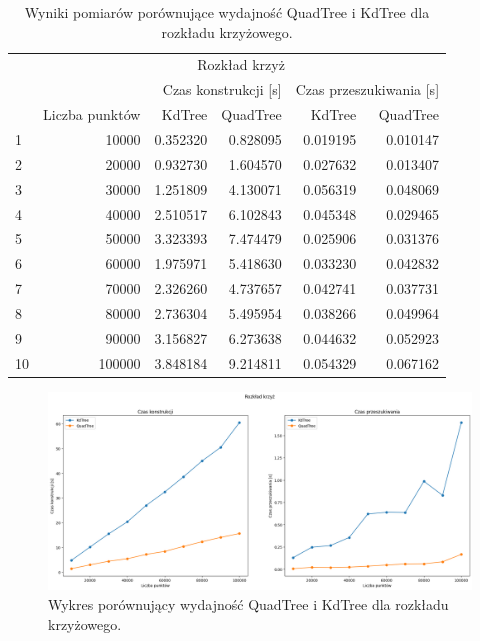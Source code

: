 \documentclass{lab}
\begin{document}
\begin{table}[H]
\centering
\begin{tabular}{lrrrrr}
  \toprule
   & \multicolumn{5}{c}{Rozkład krzyż} \\
   &  & \multicolumn{2}{r}{Czas konstrukcji [s]} & \multicolumn{2}{r}{Czas przeszukiwania [s]} \\
   & Liczba punktów & KdTree & QuadTree & KdTree & QuadTree \\
  \midrule
 1 & 10000 & 0.352320 & 0.828095 & 0.019195 & 0.010147 \\
2 & 20000 & 0.932730 & 1.604570 & 0.027632 & 0.013407 \\
3 & 30000 & 1.251809 & 4.130071 & 0.056319 & 0.048069 \\
4 & 40000 & 2.510517 & 6.102843 & 0.045348 & 0.029465 \\
5 & 50000 & 3.323393 & 7.474479 & 0.025906 & 0.031376 \\
6 & 60000 & 1.975971 & 5.418630 & 0.033230 & 0.042832 \\
7 & 70000 & 2.326260 & 4.737657 & 0.042741 & 0.037731 \\
8 & 80000 & 2.736304 & 5.495954 & 0.038266 & 0.049964 \\
9 & 90000 & 3.156827 & 6.273638 & 0.044632 & 0.052923 \\
10 & 100000 & 3.848184 & 9.214811 & 0.054329 & 0.067162 \\
  \bottomrule
  \end{tabular}
\caption{Wyniki pomiarów porównujące wydajność QuadTree i KdTree dla rozkładu krzyżowego.}
\label{tab:cross_time}
\end{table}

\begin{figure}[H]
  \centering
  \includegraphics[width=1\textwidth]{resources/cross_graph.png}
  \caption{Wykres porównujący wydajność QuadTree i KdTree dla rozkładu krzyżowego.}
  \label{fig:cross_graph}
\end{figure}
\end{document}
